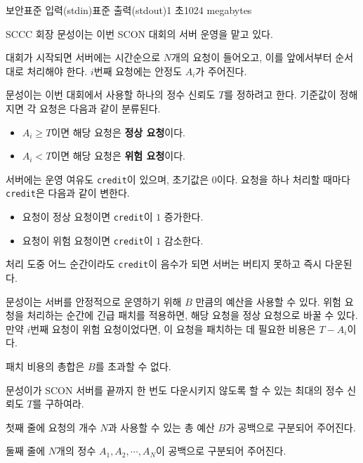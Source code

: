 \def\probtitle{보안}
\def\probno{G} %

\begin{problem}{\probtitle}{표준 입력(stdin)}{표준 출력(stdout)}{1 초}{1024 megabytes}

SCCC 회장 문성이는 이번 SCON 대회의 서버 운영을 맡고 있다.

대회가 시작되면 서버에는 시간순으로 $N$개의 요청이 들어오고, 이를 앞에서부터 순서대로 처리해야 한다.
$i$번째 요청에는 안정도 $A_i$가 주어진다.

문성이는 이번 대회에서 사용할 하나의 정수 신뢰도 $T$를 정하려고 한다.
기준값이 정해지면 각 요청은 다음과 같이 분류된다.

\begin{itemize}[topsep=0pt,noitemsep]
    \item $A_i \ge T$이면 해당 요청은 \textbf{정상 요청}이다.
    \item $A_i < T$이면 해당 요청은 \textbf{위험 요청}이다.
\end{itemize}

서버에는 운영 여유도 \texttt{credit}이 있으며, 초기값은 $0$이다.
요청을 하나 처리할 때마다 \texttt{credit}은 다음과 같이 변한다.

\begin{itemize}[topsep=0pt,noitemsep]
    \item 요청이 정상 요청이면 \texttt{credit}이 $1$ 증가한다.
    \item 요청이 위험 요청이면 \texttt{credit}이 $1$ 감소한다.
\end{itemize}

처리 도중 어느 순간이라도 \texttt{credit}이 음수가 되면 서버는 버티지 못하고 즉시 다운된다.

문성이는 서버를 안정적으로 운영하기 위해 $B$ 만큼의 예산을 사용할 수 있다.
위험 요청을 처리하는 순간에 긴급 패치를 적용하면, 해당 요청을 정상 요청으로 바꿀 수 있다.
만약 $i$번째 요청이 위험 요청이었다면, 이 요청을 패치하는 데 필요한 비용은 $T - A_i$이다.

패치 비용의 총합은 $B$를 초과할 수 없다.

문성이가 SCON 서버를 끝까지 한 번도 다운시키지 않도록 할 수 있는 최대의 정수 신뢰도 $T$를 구하여라.

\InputFile

첫째 줄에 요청의 개수 $N$과 사용할 수 있는 총 예산 $B$가 공백으로 구분되어 주어진다.

둘째 줄에 $N$개의 정수 $A_1, A_2, \cdots, A_N$이 공백으로 구분되어 주어진다.

\OutputFile


\end{problem}
